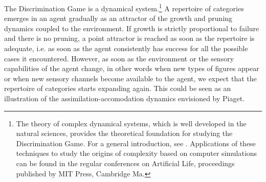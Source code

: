The Discrimination Game is a dynamical system.\footnote{
The theory of complex dynamical systems, which is well 
developed in the natural sciences, provides the 
theoretical foundation for studying the Discrimination
Game. For a general introduction, see \cite{Peitgen:1992}. 
Applications of these techniques to study the origins
of complexity based on computer simulations 
can be found in the regular conferences on Artificial
Life, proceedings published by MIT Press, Cambridge Ma.} A repertoire of
categories emerges in an agent gradually as an attractor of the
growth and pruning dynamics coupled to 
the environment. If growth is strictly proportional to failure
and there is no pruning, a point attractor
is reached as soon as the repertoire
is adequate, i.e. as soon 
as the agent consistently has success
for all the possible cases it encountered. However, 
as soon as the environment or the sensory capabilities of 
the agent change, in other words when new types of 
figures appear or when new sensory channels become available
to the agent, we expect that the repertoire of categories starts
expanding again. This could be seen as an illustration  of the
assimilation-accomodation dynamics envisioned by Piaget. 

